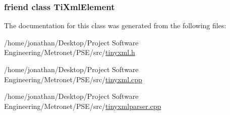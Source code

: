 \subsubsection[{\texorpdfstring{Ti\+Xml\+Element}{TiXmlElement}}]{\setlength{\rightskip}{0pt plus 5cm}friend class {\bf Ti\+Xml\+Element}\hspace{0.3cm}{\ttfamily [friend]}}\hypertarget{class_ti_xml_text_ab6592e32cb9132be517cc12a70564c4b}{}\label{class_ti_xml_text_ab6592e32cb9132be517cc12a70564c4b}


The documentation for this class was generated from the following files\+:\begin{DoxyCompactItemize}
\item 
/home/jonathan/\+Desktop/\+Project Software Engineering/\+Metronet/\+P\+S\+E/src/\hyperlink{tinyxml_8h}{tinyxml.\+h}\item 
/home/jonathan/\+Desktop/\+Project Software Engineering/\+Metronet/\+P\+S\+E/src/\hyperlink{tinyxml_8cpp}{tinyxml.\+cpp}\item 
/home/jonathan/\+Desktop/\+Project Software Engineering/\+Metronet/\+P\+S\+E/src/\hyperlink{tinyxmlparser_8cpp}{tinyxmlparser.\+cpp}\end{DoxyCompactItemize}
